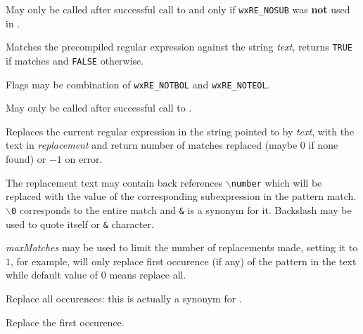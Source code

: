 May only be called after successful call to  
and only if {\tt wxRE\_NOSUB} was {\bf not} used in 
.

\label{wxregexmatches}


Matches the precompiled regular expression against the string {\it text},
returns {\tt TRUE} if matches and {\tt FALSE} otherwise.

Flags may be combination of {\tt wxRE\_NOTBOL} and {\tt wxRE\_NOTEOL}.

May only be called after successful call to .

\label{wxregexreplace}


Replaces the current regular expression in the string pointed to by
{\it text}, with the text in {\it replacement} and return number of matches
replaced (maybe $0$ if none found) or $-1$ on error.

The replacement text may contain back references {\tt $\backslash$number} which will be
replaced with the value of the corresponding subexpression in the
pattern match. {\tt $\backslash$0} corresponds to the entire match and {\tt \&} is a
synonym for it. Backslash may be used to quote itself or {\tt \&} character.

{\it maxMatches} may be used to limit the number of replacements made, setting
it to $1$, for example, will only replace first occurence (if any) of the
pattern in the text while default value of $0$ means replace all.

\label{wxregexreplaceall}


Replace all occurences: this is actually a synonym for 
.



\label{wxregexreplacefirst}


Replace the first occurence.



